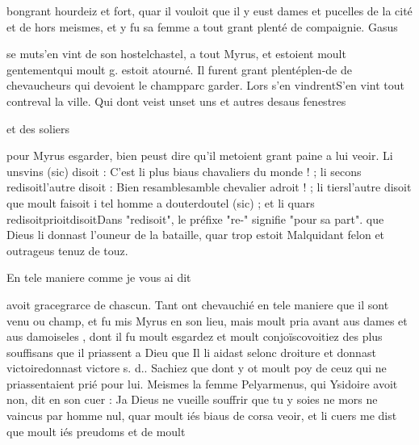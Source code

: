 \documentclass{article}
\begin{document}
\begin{pages}
                  bongrant hourdeiz et fort, quar il vouloit que il y eust dames et pucelles de la cité
               et de hors meismes, et y fu sa femme a tout grant plenté de compaignie. \pend
            \pstart Gasus
               
                  se muts'en vint de son 
                  hostelchastel, a tout Myrus, 
                  et estoient moult gentementqui moult g. estoit atourné. Il furent grant 
                  plentéplen-de de chevaucheurs qui devoient le 
                  champparc garder. 
                  Lors s’en vindrentS'en vint tout contreval la ville. Qui dont veist 
                  unset uns et autres 
                  desaus fenestres 
                  
                        et des soliers
               
                  pour
               Myrus esgarder, bien peust dire qu’il metoient
               grant paine a lui veoir. Li 
                  unsvins (sic) disoit : C’est li plus biaus 
                     chavaliers du monde ! ; 
                  li secons redisoitl'autre disoit : Bien 
                     resamblesamble chevalier adroit ! ; 
                  li tiersl'autre disoit que moult faisoit 
                     i tel homme a 
                     douterdoutel (sic) ; et li quars 
                  redisoitprioitdisoitDans "redisoit", le préfixe "re-" signifie "pour sa
                  part". que Dieus li donnast l’ouneur de
                  la bataille, quar trop estoit Malquidant
                  felon et outrageus 
                     tenuz de touz. 
                  
                        En tele maniere 
                              comme je vous ai dit

                      avoit 
                        gracegrarce de chascun. Tant ont chevauchié 
                  en tele maniere
               que il sont venu ou champ, et fu 
                  mis
               Myrus en son lieu, mais moult pria avant aus dames
               et aus damoiseles
                  , dont il fu moult esgardez et moult 
                        conjoïscovoitiez des plus souffisans que il priassent 
                  a Dieu que Il li 
                  aidast selonc droiture et donnast victoiredonnast victore s. d.. Sachiez que 
                  dont y ot moult poy de ceuz qui ne 
                  priassentaient prié pour lui. Meismes la femme Pelyarmenus,
               qui Ysidoire avoit non, dit en son cuer : Ja Dieus ne vueille souffrir que tu y soies 
                     ne mors ne vaincus 
                     par homme nul, quar 
                     moult iés biaus 
                     de corsa veoir, et li cuers me dist que moult iés
                     preudoms et de 
                        moult
                     

\end{pages}
\end{document}
